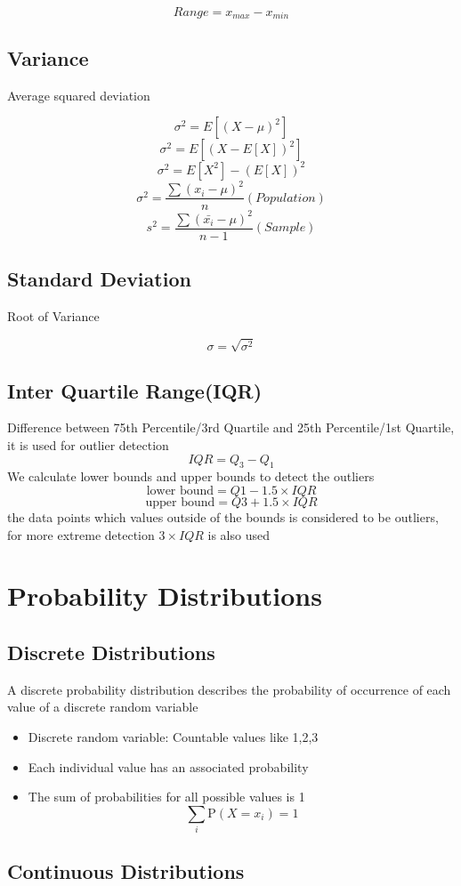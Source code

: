 \documentclass[12pt]{extarticle}
\begin{document}
$$ Range = x_{max} - x_{min} $$ 

\subsection{Variance}
Average squared deviation  

$$\sigma^2 = E[(X - \mu)^2]$$
$$\sigma^2 = E[(X - E[X])^2]$$
$$\sigma^2 = E[X^2]-(E[X])^2$$
$$ \sigma^2 = \frac{\sum (x_i - \mu)^2}{n} (Population) $$ 
$$ s^2 = \frac{\sum( \bar{x_i} - \mu)^2}{n-1} (Sample)  $$ 

\subsection{Standard Deviation}
Root of Variance 

$$ \sigma = \sqrt{\sigma^2} $$
\subsection{Inter Quartile Range(IQR)}
Difference between 75th Percentile/3rd Quartile and 25th Percentile/1st Quartile, it is used for outlier detection 
$$IQR = Q_3 - Q_1$$ 
We calculate lower bounds and upper bounds to detect the outliers
$$ \text{lower bound}= Q1-1.5 \times IQR$$
$$ \text{upper bound}= Q3+1.5 \times IQR$$
the data points which values outside of the bounds is considered to be outliers, for more extreme detection \(3 \times IQR\) is also used

\section{Probability Distributions}

\subsection{Discrete Distributions}
A discrete probability distribution describes the probability of occurrence of each value of a discrete random variable
\begin{itemize}
    \item Discrete random variable: Countable values like 1,2,3
    \item Each individual value has an associated probability 
    \item The sum of probabilities for all possible values is 1
    $$ \sum_i \mathrm{P}(X=x_i)=1$$
\end{itemize}

\subsection{Continuous Distributions}
\end{document}
